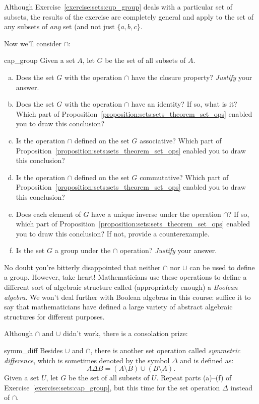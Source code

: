 Although Exercise~\ref{exercise:sets:cup_group} deals with a particular set of subsets,  the results of the  exercise are completely general and apply to the set of any subsets of \emph{any} set (and not just $\{a,b,c\}$.  
 
Now we'll consider $\cap$:

\begin{exercise}{cap_group}
Given a set $A$, let $G$ be the set of all subsets of $A$. 
\begin{enumerate}[(a)]
\item
Does the set $G$  with the operation $\cap$ have the closure property? \emph{Justify} your answer.
\item
Does the set $G$  with the operation $\cap$ have an identity? If so, what is it? Which part of  Proposition~\ref{proposition:sets:sets_theorem_set_ops} enabled you to draw this conclusion?
\item
Is the operation $\cap$ defined on the set $G$ associative? Which part of  Proposition~\ref{proposition:sets:sets_theorem_set_ops} enabled you to draw this conclusion?
\item
Is the operation $\cap$ defined on the set $G$ commutative? Which part of  Proposition~\ref{proposition:sets:sets_theorem_set_ops} enabled you to draw this conclusion?
\item
Does each element of $G$ have a unique inverse under the operation $\cap$? If so, which part of  Proposition~\ref{proposition:sets:sets_theorem_set_ops} enabled you to draw this conclusion? If not, provide a counterexample.
\item
Is the set $G$ a group under the $\cap$ operation?  \emph{Justify} your answer.
\end{enumerate}
\end{exercise} 
 

No doubt you're bitterly disappointed that neither $\cap$ nor $\cup$ can be used to define a group. However, take heart! Mathematicians use these operations to define a different sort of algebraic structure called (appropriately enough) a \emph{Boolean algebra}. We won't deal further with Boolean algebras in this course: suffice it to say that mathematicians have defined a large variety of abstract algebraic structures for different purposes.

Although $\cap$ and $\cup$ didn't work, there is a consolation prize:
 
\begin{exercise}{symm_diff}
 Besides $\cup$ and $\cap$, there is another set operation called \emph{symmetric difference}, which is sometimes denoted by the symbol $\Delta$ and is defined as:
\begin{equation*}
A \Delta B = (A \setminus B) \cup (B\setminus A).
\end{equation*}
Given a set $U$, let $G$ be the set of all subsets of $U$.  Repeat parts (a)--(f) of Exercise~\ref{exercise:sets:cap_group}, but this time for the set operation $\Delta$ instead of $\cap$.
\end{exercise} 

